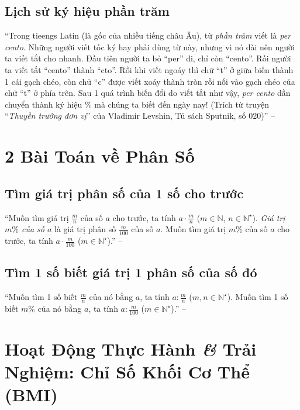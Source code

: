 \documentclass[oneside]{book}
\numberwithin{equation}{section}
\begin{document}
\subsection{Lịch sử ký hiệu phần trăm}
``Trong tieengs Latin (là gốc của nhiều tiếng châu Âu), từ \textit{phần trăm} viết là \textit{per cento}. Những người viết tốc ký hay phải dùng từ này, nhưng vì nó dài nên người ta viết tắt cho nhanh. Đầu tiên người ta bỏ ``per'' đi, chỉ còn ``cento''. Rồi người ta viết tắt ``cento'' thành ``cto''. Rồi khi viết ngoáy thì chữ ``t'' ở giữa biến thành 1 cái gạch chéo, còn chữ ``c'' được viết xoáy thành tròn rồi nối vào gạch chéo của chữ ``t'' ở phía trên. Sau 1 quá trình biến đổi do viết tắt như vậy, \textit{per cento} dần chuyển thành ký hiệu \% mà chúng ta biết đến ngày nay! (Trích từ truyện ``\textit{Thuyền trưởng đơn vị}'' của Vladimir Levshin, Tủ sách Sputnik, số 020)'' -- \cite[p. 66]{Thai_Anh_Dat_Ha_Loan_Nam_Quang_Toan_6_tap_2}


\section{2 Bài Toán về Phân Số}

\subsection{Tìm giá trị phân số của 1 số cho trước}
``Muốn tìm giá trị $\frac{m}{n}$ của số $a$ cho trước, ta tính $a\cdot\frac{m}{n}$ ($m\in\mathbb{N}$, $n\in\mathbb{N}^\star$). \emph{Giá trị $m\%$ của số $a$} là giá trị phân số $\frac{m}{100}$ của số $a$. Muốn tìm giá trị $m\%$ của số $a$ cho trước, ta tính $a\cdot\frac{m}{100}$ ($m\in\mathbb{N}^\star$).'' -- \cite[p. 68]{Thai_Anh_Dat_Ha_Loan_Nam_Quang_Toan_6_tap_2}

\subsection{Tìm 1 số biết giá trị 1 phân số của số đó}
``Muốn tìm 1 số biết $\frac{m}{n}$ của nó bằng $a$, ta tính $a:\frac{m}{n}$ ($m,n\in\mathbb{N}^\star$). Muốn tìm 1 số biết $m\%$ của nó bằng $a$, ta tính $a:\frac{m}{100}$ ($m\in\mathbb{N}^\star$).'' -- \cite[p. 68]{Thai_Anh_Dat_Ha_Loan_Nam_Quang_Toan_6_tap_2}


\section{Hoạt Động Thực Hành \textit{\&} Trải Nghiệm: Chỉ Số Khối Cơ Thể (BMI)}
\end{document}
